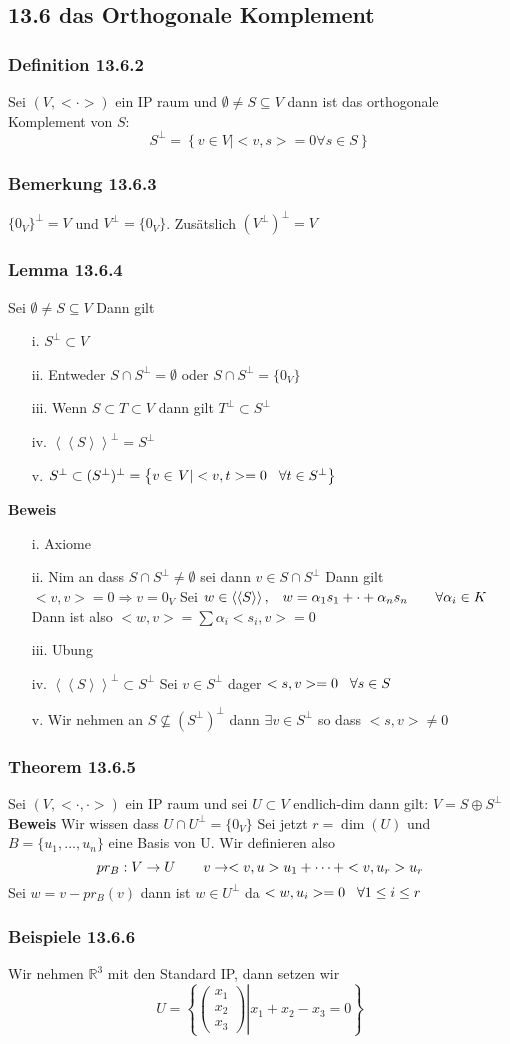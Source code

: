 \documentclass{article}
\newcommand{\mspc}{\hspace{0.7cm}}
\newcommand{\smspc}{\hspace{0.3cm}}
\newcommand{\kk}[1]{\left<\left<{#1}\right>\right>}
\newcommand{\beweis}{\\\textbf{Beweis }}
\newcommand{\Beweis}{\textbf{Beweis }}
\newcommand{\beispiel}[1]{\subsubsection*{Beispiele {#1}}}
\newcommand{\bemerkung}[1]{\subsubsection*{Bemerkung {#1}}}
\newcommand{\theorem}[1]{\subsubsection*{Theorem {#1}}}
\newcommand{\lemma}[1]{\subsubsection*{Lemma {#1}}}
\newcommand{\definition}[1]{\subsubsection*{Definition {#1}}}
\begin{document}
\subsection*{13.6 das Orthogonale Komplement}
\definition{13.6.2} Sei $(V,<\cdot>)$ ein IP raum und $\emptyset\neq S\subseteq V$ dann ist das orthogonale Komplement von $S$:\[S^\perp=\left\lbrace \left.v\in V\right|<v,s>=0\forall s \in S\right\rbrace\]
\bemerkung{13.6.3} $\lbrace 0_V\rbrace^\perp=V$ und $V^\perp =\lbrace 0_V\rbrace$. Zusätslich $(V^\perp)^\perp = V$
\lemma{13.6.4} Sei $\emptyset\neq S\subseteq V$ Dann gilt\begin{itemize}
  \item[i.]{$S^\perp \subset V$}
  \item[ii.]{Entweder $S\cap S^\perp=\emptyset$ oder $S\cap S^\perp=\lbrace 0_V\rbrace$}
  \item[iii.]{Wenn $S\subset T\subset V$ dann gilt $T^\perp\subset S^\perp$}
  \item[iv.]{$\kk{S}^\perp =S^\perp$}
  \item[v.]{$S^\perp\subset(S^\perp)^\perp=\left\lbrace v\in\left. V\right| <v,t>=0\smspc\forall t\in S^\perp\right\rbrace$}
\end{itemize}
\Beweis \begin{itemize}
  \item[i.]{Axiome}
  \item[ii.]{ Nim an dass $S\cap S^\perp\neq\emptyset$ sei dann $v\in S\cap S^\perp$ Dann gilt $<v,v>=0\Rightarrow v=0_V$ Sei $w\in\kk{S}, \smspc w=\alpha_1s_1+\cdot +\alpha_ns_n\mspc \forall \alpha_i\in K$ Dann ist also $<w,v>=\sum\alpha_i<s_i,v>=0$}
  \item[iii.]{Ubung}
  \item[iv.]{$\kk{S}^\perp\subset S^\perp$ Sei $v\in S^\perp$ dager $<s,v>=0\smspc\forall s\in S$}
  \item[v.]{Wir nehmen an $S\not\subseteq (S^\perp)^\perp$ dann $\exists v\in S^\perp$ so dass $<s,v>\neq 0$}
\end{itemize}
\theorem{13.6.5} Sei $(V,<\cdot,\cdot>)$ ein IP raum und sei $U\subset V$ endlich-dim dann gilt: $V=S\oplus S^\perp$
\beweis Wir wissen dass $U\cap U^\perp=\lbrace 0_V\rbrace$ Sei jetzt $r=\dim(U)$ und $B=\lbrace u_1, ..., u_n\rbrace$ eine Basis von U. Wir definieren also \[pr_B:V\rightarrow U\mspc v\rightarrow <v,u>u_1+\cdots+<v,u_r>u_r\]
Sei $w=v-pr_B(v)$ dann ist $w\in U^\perp$ da $<w,u_i>=0\smspc\forall1\le i\le r$
\beispiel{13.6.6} Wir nehmen $\mathbb{R}^3$ mit den Standard IP, dann setzen wir \[U=\left\lbrace\left.\begin{pmatrix}x_1\\x_2\\x_3\end{pmatrix}\right|x_1+x_2-x_3=0\right\rbrace\]
\end{document}
